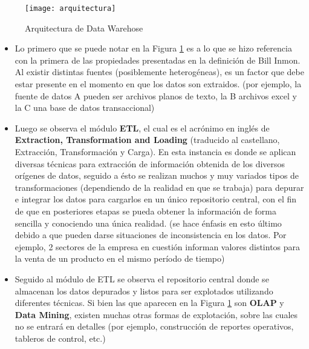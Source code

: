 \documentclass[a4paper,11pt]{article}
\begin{document}
\begin{flushleft}
    \begin{figure}
      \begin{center}
        \texttt{[image: arquitectura]}
        \caption{Arquitectura de Data Warehose}
        \label{dw_arq}
      \end{center}
    \end{figure}
   
    \begin{itemize}
      \item Lo primero que se puede notar en la Figura \ref{dw_arq} es a lo que se hizo referencia con la primera de las propiedades presentadas en la
      definición de Bill Inmon. Al existir distintas fuentes (posiblemente heterogéneas), es un factor que debe estar presente en el momento en que los
      datos son extraidos. (por ejemplo, la fuente de datos A pueden ser archivos planos de texto, la B archivos excel y la C una base de datos 
      transaccional)\par
    
      \item Luego se observa el módulo \textbf{ETL}, el cual es el acrónimo en inglés de \textbf{Extraction, Transformation and Loading} (traducido al
      castellano, Extracción, Transformación y Carga). En esta instancia es donde se aplican diversas técnicas para extracción de información obtenida de
      los diversos orígenes de datos, seguido a ésto se realizan muchos y muy variados tipos de transformaciones (dependiendo de la realidad en que se
      trabaja) para depurar e integrar los datos para cargarlos en un único repositorio central, con el fin de que en posteriores etapas se pueda obtener
      la información de forma sencilla y conociendo una única realidad. (se hace énfasis en esto último debido a que pueden darse situaciones de
      inconsistencia en los datos. Por ejemplo, 2 sectores de la empresa en cuestión informan valores distintos para la venta de un producto en el mismo
      período de tiempo)\par
    
      \item Seguido al módulo de ETL se observa el repositorio central donde se almacenan los datos depurados y listos para ser explotados utilizando
      diferentes técnicas. Si bien las que aparecen en la Figura \ref{dw_arq} son \textbf{OLAP} y \textbf{Data Mining}, existen muchas otras formas de 
      explotación, sobre las cuales no se entrará en detalles (por ejemplo, construcción de reportes operativos, tableros de control, etc.)\par
    

\end{itemize}
\end{flushleft}
\end{document}
